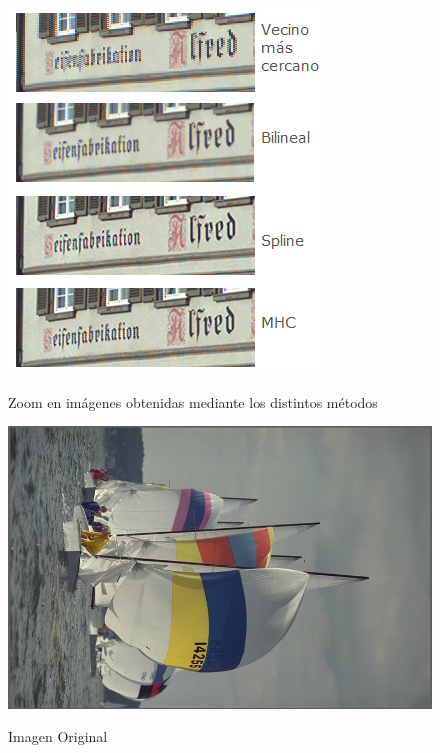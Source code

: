 \documentclass[a4paper]{article}
\begin{document}
\begin{figure}[h!]
    \caption{Zoom en imágenes obtenidas mediante los distintos métodos}
    \begin{center}
    \includegraphics[scale=0.9]{imagenes/comparacion/04/letrero}
    \label{letrero}
  \end{center}
\end{figure}

\newpage

\begin{figure}[h!]
    \caption{Imagen Original}
    \begin{center}
    \includegraphics[scale=0.15]{imagenes/comparacion/05/img5}
    \label{imgOri2}
  \end{center}
\end{figure}
\end{document}
